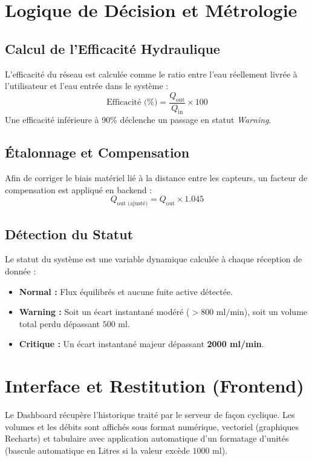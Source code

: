 \documentclass[12pt,a4paper]{article}
\begin{document}
\section{Logique de Décision et Métrologie}

\subsection{Calcul de l'Efficacité Hydraulique}
L'efficacité du réseau est calculée comme le ratio entre l'eau réellement livrée à l'utilisateur et l'eau entrée dans le système :
\begin{equation}
\boxed{\text{Efficacité (\%)} = \frac{Q_{\text{out}}}{Q_{\text{in}}} \times 100}
\end{equation}
Une efficacité inférieure à 90\% déclenche un passage en statut \textit{Warning}.

\subsection{Étalonnage et Compensation}
Afin de corriger le biais matériel lié à la distance entre les capteurs, un facteur de compensation est appliqué en backend :
\begin{equation}
Q_{\text{out (ajusté)}} = Q_{\text{out}} \times 1.045
\end{equation}

\subsection{Détection du Statut}
Le statut du système est une variable dynamique calculée à chaque réception de donnée :
\begin{itemize}
    \item \textbf{\textcolor{vertaccent}{Normal :}} Flux équilibrés et aucune fuite active détectée.
    \item \textbf{\textcolor{bleufonce}{Warning :}} Soit un écart instantané modéré ($> 800 \text{ ml/min}$), soit un volume total perdu dépassant $500 \text{ ml}$.
    \item \textbf{\textcolor{bleuprincipal}{Critique :}} Un écart instantané majeur dépassant \textbf{2000 ml/min}.
\end{itemize}

\section{Interface et Restitution (Frontend)}
Le Dashboard récupère l'historique traité par le serveur de façon cyclique. Les volumes et les débits sont affichés sous format numérique, vectoriel (graphiques \textsf{Recharts}) et tabulaire avec application automatique d'un formatage d'unités (bascule automatique en Litres si la valeur excède $1000 \text{ ml}$).
\end{document}
